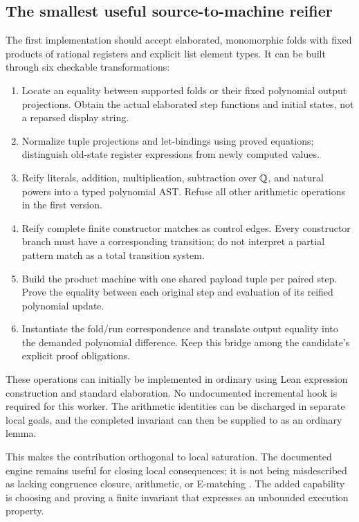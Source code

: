 \subsection{The smallest useful source-to-machine reifier}
The first implementation should accept elaborated, monomorphic folds with
fixed products of rational registers and explicit list element types. It can
be built through six checkable transformations:
\begin{enumerate}
\item Locate an equality between supported folds or their fixed polynomial
      output projections. Obtain the actual elaborated step functions and
      initial states, not a reparsed display string.
\item Normalize tuple projections and let-bindings using proved equations;
      distinguish old-state register expressions from newly computed values.
\item Reify literals, addition, multiplication, subtraction over $\mathbb Q$, and
      natural powers into a typed polynomial AST. Refuse all other arithmetic
      operations in the first version.
\item Reify complete finite constructor matches as control edges. Every
      constructor branch must have a corresponding transition; do not
      interpret a partial pattern match as a total transition system.
\item Build the product machine with one shared payload tuple per paired step.
      Prove the equality between each original step and evaluation of its
      reified polynomial update.
\item Instantiate the fold/run correspondence and translate output equality
      into the demanded polynomial difference. Keep this bridge among the
      candidate's explicit proof obligations.
\end{enumerate}

These operations can initially be implemented in ordinary  using
Lean expression construction and standard elaboration. No undocumented
incremental  hook is required for this worker. The arithmetic
identities can be discharged in separate local goals, and the completed
invariant can then be supplied to  as an ordinary lemma.

This makes the contribution orthogonal to local saturation. The documented
 engine remains useful for closing local consequences; it is not
being misdescribed as lacking congruence closure, arithmetic, or E-matching
\cite{grind}. The added capability is choosing and proving a finite invariant
that expresses an unbounded execution property.


